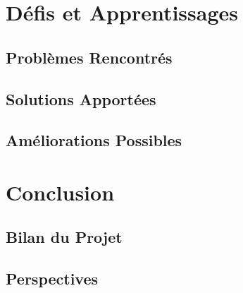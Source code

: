 \documentclass{article}
\begin{document}
\section{Défis et Apprentissages}
\subsection{Problèmes Rencontrés}
\subsection{Solutions Apportées}
\subsection{Améliorations Possibles}

\section{Conclusion}
\subsection{Bilan du Projet}
\subsection{Perspectives}
\end{document}

